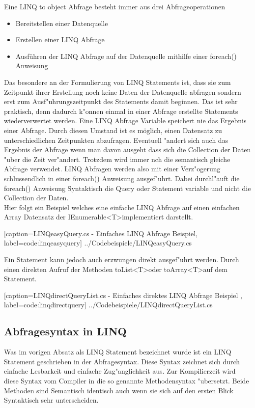 \documentclass[pagesize, paper=a4, fontsize=12pt,titlepage=true, headings=small, headnosepline, abstractoff, liststotoc, nochapterprefix, plainheadsepline]{scrreprt}
\newcommand{\GTS}{\textless T\textgreater\space}
\begin{document}
Eine LINQ to object Abfrage besteht immer aus drei Abfrageoperationen
\begin{itemize}
\item Bereitstellen einer Datenquelle
\item Erstellen einer LINQ Abfrage
\item Ausführen der LINQ Abfrage auf der Datenquelle mithilfe einer foreach() Anweisung
\end{itemize}
Das besondere an der Formulierung von LINQ Statements ist, dass sie zum Zeitpunkt ihrer Erstellung noch keine Daten der Datenquelle abfragen sondern erst zum Ausf"uhrungszeitpunkt des Statements damit beginnen. Das ist sehr praktisch, denn dadurch k"onnen einmal in einer Abfrage erstellte Statements wiederverwertet werden. Eine LINQ Abfrage Variable speichert nie das Ergebnis einer Abfrage. Durch diesen Umstand ist es möglich, einen Datensatz zu unterschiedlichen Zeitpunkten abzufragen. Eventuell "andert sich auch das Ergebnis der Abfrage wenn man davon ausgeht dass sich die Collection der Daten "uber die Zeit ver"andert. Trotzdem wird immer nch die semantisch gleiche Abfrage verwendet. LINQ Abfragen werden also mit einer Verz"ogerung schlussendlich in einer foreach() Anweisung ausgef"uhrt. Dabei durchl"auft die foreach() Anweisung Syntaktisch die Query oder Statement variable und nicht die Collection der Daten.
\\
Hier folgt ein Beispiel welches eine einfache LINQ Abfrage auf einen einfachen Array Datensatz der IEnumerable\GTS implementiert darstellt.

			[caption={LINQeasyQuery.cs - Einfaches LINQ Abfrage Beispiel}, label=code:linqeasyquery]
			{../Codebeispiele/LINQeasyQuery.cs}

Ein Statement kann jedoch auch erzwungen direkt ausgef"uhrt werden. Durch einen direkten Aufruf der Methoden toList\GTS oder toArray\GTS auf dem Statement.

			[caption={LINQdirectQueryList.cs - Einfaches direktes LINQ Abfrage Beispiel} \protect\cite{MicrosoftCReferenz.2013}, label=code:linqdirectquery]
			{../Codebeispiele/LINQdirectQueryList.cs}
		\subsection {Abfragesyntax in LINQ}
		Was im vorigen Absatz als LINQ Statement bezeichnet wurde ist ein LINQ Statement geschrieben in der Abfragesyntax. Diese Syntax zeichnet sich durch einfache Lesbarkeit und einfache Zug"anglichkeit aus. Zur Kompilierzeit wird diese Syntax vom Compiler in die so genannte Methodensyntax "ubersetzt. Beide Methoden sind Semantisch identisch auch wenn sie sich auf den ersten Blick Syntaktisch sehr unterscheiden.
\end{document}
